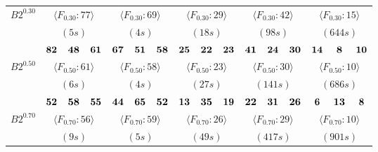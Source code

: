 \documentclass[12pt]{article}
\theoremstyle{thmstyleone}%
\theoremstyle{definition}
\begin{document}
\begin{table}[!ht]
\begin{tabular}{| l | c c c  | c c c | c c c | c c c | c c c | }
\textbf{$B2^{0.30}$}& \multicolumn{3}{c|}{$\langle F_{0.30}:77 \rangle$ }& \multicolumn{3}{c|}{$\langle F_{0.30}:69 \rangle$ }& \multicolumn{3}{c|}{$\langle F_{0.30}:29 \rangle$ }& \multicolumn{3}{c|}{$\langle F_{0.30}:42 \rangle$ }& \multicolumn{3}{c|}{$\langle F_{0.30}:15 \rangle$ } \\
& \multicolumn{3}{c|}{$(5s)$}& \multicolumn{3}{c|}{$(4s)$}& \multicolumn{3}{c|}{$(18s)$}& \multicolumn{3}{c|}{$(98s)$}& \multicolumn{3}{c|}{$(644s)$} \\ \hline
& $\bf 82$ & $\bf 48$ & $\bf 61$ & $\bf 67$ & $\bf 51$ & $\bf 58$ & $\bf 25$ & $\bf 22$ & $\bf 23$ & $\bf 41$ & $\bf 24$ & $\bf 30$ & $\bf 14$ & $\bf 8$ & $\bf 10$ \\

\textbf{$B2^{0.50}$}& \multicolumn{3}{c|}{$\langle F_{0.50}:61 \rangle$ }& \multicolumn{3}{c|}{$\langle F_{0.50}:58 \rangle$ }& \multicolumn{3}{c|}{$\langle F_{0.50}:23 \rangle$ }& \multicolumn{3}{c|}{$\langle F_{0.50}:30 \rangle$ }& \multicolumn{3}{c|}{$\langle F_{0.50}:10 \rangle$ } \\
& \multicolumn{3}{c|}{$(6s)$}& \multicolumn{3}{c|}{$(4s)$}& \multicolumn{3}{c|}{$(27s)$}& \multicolumn{3}{c|}{$(141s)$}& \multicolumn{3}{c|}{$(686s)$} \\ \hline
& $\bf 52$ & $\bf 58$ & $\bf 55$ & $\bf 44$ & $\bf 65$ & $\bf 52$ & $\bf 13$ & $\bf 35$ & $\bf 19$ & $\bf 22$ & $\bf 31$ & $\bf 26$ & $\bf 6$ & $\bf 13$ & $\bf 8$ \\

\textbf{$B2^{0.70}$}& \multicolumn{3}{c|}{$\langle F_{0.70}:56 \rangle$ }& \multicolumn{3}{c|}{$\langle F_{0.70}:59 \rangle$ }& \multicolumn{3}{c|}{$\langle F_{0.70}:26 \rangle$ }& \multicolumn{3}{c|}{$\langle F_{0.70}:29 \rangle$ }& \multicolumn{3}{c|}{$\langle F_{0.70}:10 \rangle$ } \\
& \multicolumn{3}{c|}{$(9s)$}& \multicolumn{3}{c|}{$(5s)$}& \multicolumn{3}{c|}{$(49s)$}& \multicolumn{3}{c|}{$(417s)$}& \multicolumn{3}{c|}{$(901s)$} \\ \hline


\end{tabular}
\end{table}
\end{document}
